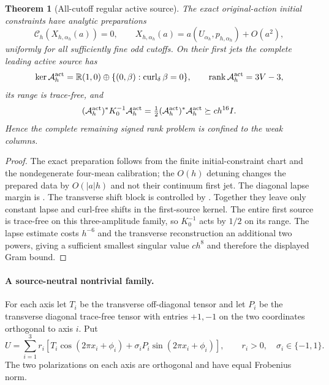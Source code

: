 \documentclass[11pt]{article}
\newtheorem{theorem}{Theorem}[section]
\numberwithin{equation}{section}
\theoremstyle{definition}
\theoremstyle{remark}
\newcommand{\rank}{\operatorname{rank}}
\begin{document}
\begin{theorem}[All-cutoff regular active source]
\label{thm:supp-exact-active-regular}
The exact original-action initial constraints have analytic preparations
\begin{equation}
 \mathscr C_h(X_{h,\alpha_h}(a))=0,
 \qquad X_{h,\alpha_h}(a)=a(U_{\alpha_h},p_{h,\alpha_h})+O(a^2),
 \label{eq:supp-exact-detuned-preparation}
\end{equation}
uniformly for all sufficiently fine odd cutoffs.  On their first jets the
complete leading active source has
\begin{equation}
 \ker\mathcal A_h^{\rm act}=\mathbb R(1,0)
 \oplus\{(0,\beta):\operatorname{curl}_\delta\beta=0\},
 \qquad \rank\mathcal A_h^{\rm act}=3V-3,
 \label{eq:supp-exact-active-rank}
\end{equation}
its range is trace-free, and
\begin{equation}
 (\mathcal A_h^{\rm act})^*K_0^{-1}\mathcal A_h^{\rm act}
 =\tfrac12(\mathcal A_h^{\rm act})^*\mathcal A_h^{\rm act}
 \succeq ch^{16}I.
 \label{eq:supp-exact-active-Gram}
\end{equation}
Hence the complete remaining signed rank problem is confined to the weak
columns.
\end{theorem}
\begin{proof}
The exact preparation follows from the finite initial-constraint chart and
the nondegenerate four-mean calibration; the $O(h)$ detuning changes the
prepared data by $O(|a|h)$ and not their continuum first jet.  The diagonal
lapse margin is .  The transverse
shift block is controlled by .  Together they
leave only constant lapse and curl-free shifts in the first-source kernel.
The entire first source is trace-free on this three-amplitude family, so
$K_0^{-1}$ acts by $1/2$ on its range.  The lapse estimate costs $h^{-6}$ and
the transverse reconstruction an additional two powers, giving a sufficient
smallest singular value $ch^8$ and therefore the displayed Gram bound.
\end{proof}

\paragraph{A source-neutral nontrivial family.}
For each axis let $T_i$ be the transverse off-diagonal tensor and let $P_i$
be the transverse diagonal trace-free tensor with entries $+1,-1$ on the two
coordinates orthogonal to axis $i$.  Put
\begin{equation}
 U=\sum_{i=1}^3r_i\left[T_i\cos(2\pi x_i+\phi_i)
          +\sigma_iP_i\sin(2\pi x_i+\phi_i)\right],
 \qquad r_i>0,\quad\sigma_i\in\{-1,1\}.
 \label{eq:supp-exact-balanced-family}
\end{equation}
The two polarizations on each axis are orthogonal and have equal Frobenius
norm.
\end{document}
